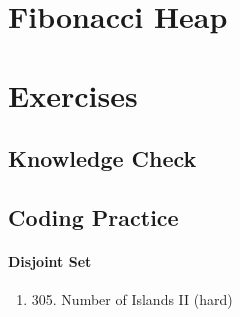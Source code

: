 \documentclass[../main.tex]{subfiles}
\begin{document}
\section{Fibonacci Heap}
\section{Exercises}
\subsection{Knowledge Check}
\subsection{Coding Practice}
\paragraph{Disjoint Set}
\begin{enumerate}
    \item 305. Number of Islands II (hard)
\end{enumerate}
\end{document}
